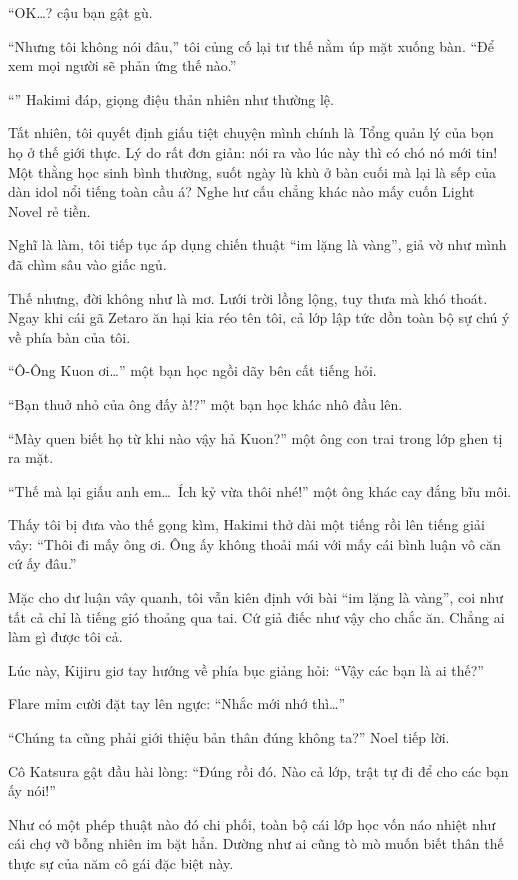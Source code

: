 \documentclass[../main.tex]{subfiles}
\begin{document}
``OK\dots? cậu bạn gật gù.

``Nhưng tôi không nói đâu,'' tôi củng cố lại tư thế nằm úp mặt xuống bàn. ``Để xem mọi người sẽ phản ứng thế nào.''

``'' Hakimi đáp, giọng điệu thản nhiên như thường lệ.

Tất nhiên, tôi quyết định giấu tiệt chuyện mình chính là Tổng quản lý của bọn họ ở thế giới thực. Lý do rất đơn giản: nói ra vào lúc này thì có chó nó mới tin! Một thằng học sinh bình thường, suốt ngày lù khù ở bàn cuối mà lại là sếp của dàn idol nổi tiếng toàn cầu á? Nghe hư cấu chẳng khác nào mấy cuốn Light Novel rẻ tiền.

Nghĩ là làm, tôi tiếp tục áp dụng chiến thuật ``im lặng là vàng'', giả vờ như mình đã chìm sâu vào giấc ngủ.

Thế nhưng, đời không như là mơ. Lưới trời lồng lộng, tuy thưa mà khó thoát. Ngay khi cái gã Zetaro ăn hại kia réo tên tôi, cả lớp lập tức dồn toàn bộ sự chú ý về phía bàn của tôi.

``Ô-Ông Kuon ơi\dots''  một bạn học ngồi dãy bên cất tiếng hỏi.

``Bạn thuở nhỏ của ông đấy à!?'' một bạn học khác nhô đầu lên.

``Mày quen biết họ từ khi nào vậy hả Kuon?'' một ông con trai trong lớp ghen tị ra mặt.

``Thế mà lại giấu anh em\dots\ Ích kỷ vừa thôi nhé!'' một ông khác cay đắng bĩu môi.

Thấy tôi bị đưa vào thế gọng kìm, Hakimi thở dài một tiếng rồi lên tiếng giải vây: ``Thôi đi mấy ông ơi. Ông ấy không thoải mái với mấy cái bình luận vô căn cứ ấy đâu.''

Mặc cho dư luận vây quanh, tôi vẫn kiên định với bài ``im lặng là vàng'', coi như tất cả chỉ là tiếng gió thoảng qua tai. Cứ giả điếc như vậy cho chắc ăn. Chẳng ai làm gì được tôi cả.

Lúc này, Kijiru giơ tay hướng về phía bục giảng hỏi: ``Vậy các bạn là ai thế?''

Flare mỉm cười đặt tay lên ngực: ``Nhắc mới nhớ thì\dots''

``Chúng ta cũng phải giới thiệu bản thân đúng không ta?'' Noel tiếp lời.

Cô Katsura gật đầu hài lòng: ``Đúng rồi đó. Nào cả lớp, trật tự đi để cho các bạn ấy nói!''

Như có một phép thuật nào đó chi phối, toàn bộ cái lớp học vốn náo nhiệt như cái chợ vỡ bỗng nhiên im bặt hẳn. Dường như ai cũng tò mò muốn biết thân thế thực sự của năm cô gái đặc biệt này.
\end{document}
